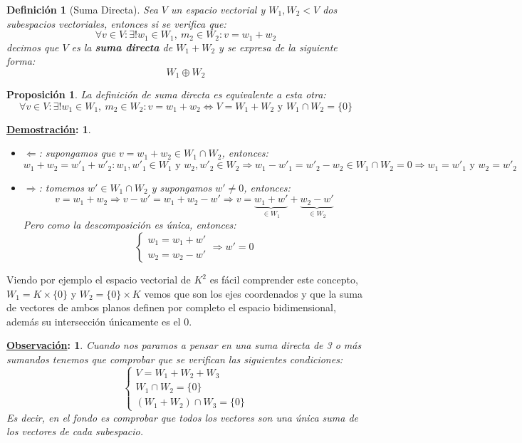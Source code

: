 \documentclass[10pt,a4paper,openright]{book}
\theoremstyle{break}
\newtheorem*{defi}{Definición}
\newtheorem*{prop}{Proposición}
\newtheorem*{demo}{\underline{Demostración}:}
\newtheorem*{obs}{\underline{Observación}:}
\begin{document}
\begin{defi}[Suma Directa]
Sea $V$ un espacio vectorial y $W_1,W_2<V$ dos subespacios vectoriales, entonces si se verifica que:
$$\forall v\in V: \exists!w_1\in W_1,\ m_2\in W_2: v=w_1+w_2$$
decimos que $V$ es la \textbf{suma directa} de $W_1+W_2$ y se expresa de la siguiente forma:
$$W_1\oplus W_2$$
\end{defi}
\begin{prop}
La definición de suma directa es equivalente a esta otra:
$$\forall v\in V: \exists!w_1\in W_1,\ m_2\in W_2: v=w_1+w_2\Leftrightarrow V=W_1+W_2\mbox{ y }  W_1\cap W_2=\{0\}$$
\end{prop}
\begin{demo}
\begin{itemize}
\item $\Leftarrow$: supongamos que $v=w_1+w_2\in W_1\cap W_2$, entonces:
$$w_1+w_2=w'_1+w'_2: w_1,w'_1\in W_1\mbox{ y } w_2,w'_2\in W_2\Rightarrow w_1-w'_1=w'_2-w_2\in W_1\cap W_2=0\Rightarrow w_1=w'_1 \mbox{ y } w_2=w'_2$$

\item $\Rightarrow$: tomemos $w'\in W_1\cap W_2$ y supongamos $w'\neq 0$, entonces:
$$v = w_1 + w_2 \Rightarrow v-w' = w_1+w_2-w'\Rightarrow v= \underbrace{w_1 + w'}_{\in W_1} + \underbrace{w_2 - w'}_{\in W_2}$$
Pero como la descomposición es única, entonces:
$$\begin{cases}
w_1 = w_1 + w' \\ w_2 = w_2 - w'
\end{cases} \Rightarrow w' = 0$$
\end{itemize}
\end{demo}

Viendo por ejemplo el espacio vectorial de $K^2$ es fácil comprender este concepto, $W_1=K\times \{0\}$ y $W_2=\{0\}\times K$ vemos que son los ejes coordenados y que la suma de vectores de ambos planos definen por completo el espacio bidimensional, además su intersección únicamente es el 0.

\begin{obs}
Cuando nos paramos a pensar en una suma directa de 3 o más sumandos tenemos que comprobar que se verifican las siguientes condiciones:
$$\begin{cases}V=W_1+W_2+W_3 \\
W_1\cap W_2=\{0\}\\
(W_1+W_2)\cap W_3=\{0\}\end{cases}$$
Es decir, en el fondo es comprobar que todos los vectores son  una única suma de los vectores de cada subespacio.
\end{obs}
\end{document}
